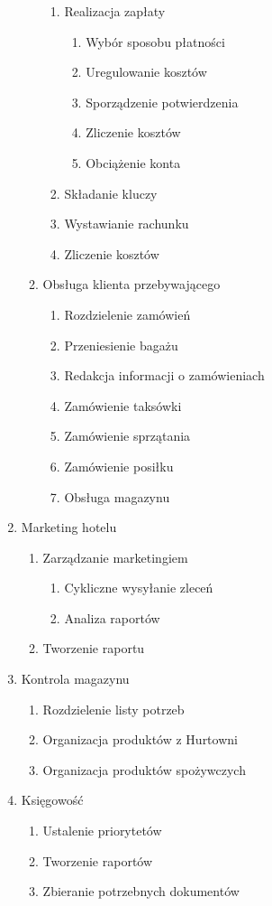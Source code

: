 \documentclass[a4paper, 11pt]{article}
\begin{document}
\begin{enumerate}[label*=\arabic*.]
\begin{enumerate}[label*=\arabic*.]
\begin{enumerate}[label*=\arabic*.]
				\item Realizacja zapłaty
				\begin{enumerate}[label*=\arabic*.]
					\item Wybór sposobu płatności
					\item Uregulowanie kosztów
					\item Sporządzenie potwierdzenia
					\item Zliczenie kosztów
					\item Obciążenie konta
				\end{enumerate}													
				\item Składanie kluczy
				\item Wystawianie rachunku
				\item Zliczenie kosztów
			\end{enumerate}						
			\item Obsługa klienta przebywającego
			\begin{enumerate}[label*=\arabic*.]
				\item Rozdzielenie zamówień
				\item Przeniesienie bagażu
				\item Redakcja informacji o zamówieniach
				\item Zamówienie taksówki
				\item Zamówienie sprzątania
				\item Zamówienie posiłku
				\item Obsługa magazynu
			\end{enumerate}						
		\end{enumerate}
		\item Marketing hotelu
		\begin{enumerate}[label*=\arabic*.]
			\item Zarządzanie marketingiem
			\begin{enumerate}[label*=\arabic*.]
				\item Cykliczne wysyłanie zleceń
				\item Analiza raportów
			\end{enumerate}	
			\item Tworzenie raportu
		\end{enumerate}		
		\item Kontrola magazynu
		\begin{enumerate}[label*=\arabic*.]
			\item Rozdzielenie listy potrzeb
			\item Organizacja produktów z Hurtowni
			\item Organizacja produktów spożywczych
		\end{enumerate}	
		\item Księgowość
		\begin{enumerate}[label*=\arabic*.]
			\item Ustalenie priorytetów
			\item Tworzenie raportów
			\item Zbieranie potrzebnych dokumentów
		\end{enumerate}	
	\end{enumerate}
	
\end{document}
